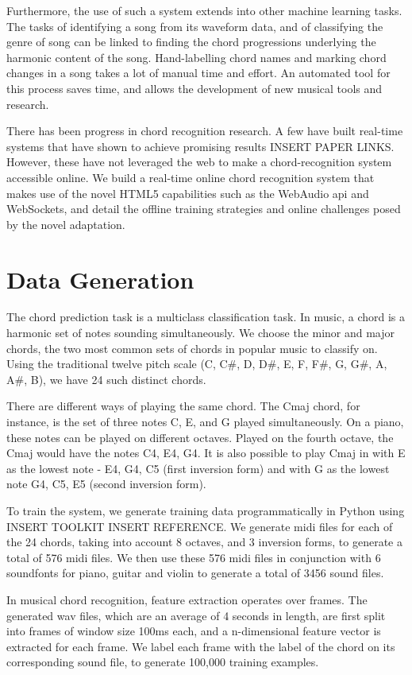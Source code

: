 \documentclass{article}
\begin{document}
Furthermore, the use of such a system extends into other machine learning tasks. The tasks of identifying a song from its waveform data, and of classifying the genre of song can be linked to finding the chord progressions underlying the harmonic content of the song. Hand-labelling chord names and marking chord changes in a song takes a lot of manual time and effort. An automated tool for this process saves time, and allows the development of new musical tools and research.

There has been progress in chord recognition research. A few have built real-time systems that have shown to achieve promising results INSERT PAPER LINKS. However, these have not leveraged the web to make a chord-recognition system accessible online. We build a real-time online chord recognition system that makes use of the novel HTML5 capabilities such as the WebAudio api and WebSockets, and detail the offline training strategies and online challenges posed by the novel adaptation.

\section{Data Generation}
The chord prediction task is a multiclass classification task. In music, a chord is a harmonic set of notes sounding simultaneously. We choose the minor and major chords, the two most common sets of chords in popular music to classify on. Using the traditional twelve pitch scale (C, C\#, D, D\#, E, F, F\#, G, G\#, A, A\#, B), we have 24 such distinct chords.

There are different ways of playing the same chord. The Cmaj chord, for instance, is the set of three notes C, E, and G played simultaneously. On a piano, these notes can be played on different octaves. Played on the fourth octave, the Cmaj would have the notes C4, E4, G4. It is also possible to play Cmaj in with E as the lowest note - E4, G4, C5 (first inversion form) and with G as the lowest note G4, C5, E5 (second inversion form).

To train the system, we generate training data programmatically in Python using INSERT TOOLKIT INSERT REFERENCE. We generate midi files for each of the 24 chords, taking into account 8 octaves, and 3 inversion forms, to generate a total of 576 midi files. We then use these 576 midi files in conjunction with 6 soundfonts for piano, guitar and violin to generate a total of 3456 sound files.

In musical chord recognition, feature extraction operates over frames. The generated wav files, which are an average of 4 seconds in length, are first split into frames of window size 100ms each, and a n-dimensional feature vector is extracted for each frame. We label each frame with the label of the chord on its corresponding sound file, to generate 100,000 training examples.
\end{document}
